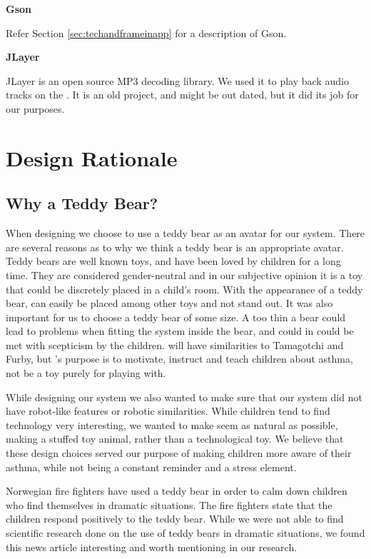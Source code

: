 \textbf{Gson}

Refer Section \ref{sec:techandframeinapp} for a description of Gson.    

\textbf{JLayer}

JLayer  is an open source MP3 decoding library. We used it to play back audio tracks on the \rpi{}. It is an old project, and might be out dated, but it did its job for our purposes.  
 

\section{Design Rationale}
\label{sec:designrationale}
\subsection{Why a Teddy Bear?}
When designing \buddy{} we choose to use a teddy bear as an avatar for our system. There are several reasons as to why we think a teddy bear is an appropriate avatar. Teddy bears are well known toys, and have been loved by children for a long time. They are considered gender-neutral\cite{stagnitti1997determining}\cite{cherney2006gender} and in our subjective opinion it is a toy that could be discretely placed in a child's room. With the appearance of a teddy bear, \buddy{} can easily be placed among other toys and not stand out. It was also important for us to choose a teddy bear of some size. A too thin a bear could lead to problems when fitting the system inside the bear, and could in could be met with scepticism by the children. \buddy{} will have similarities to Tamagotchi\cite{tamagotchi} and Furby\cite{furby}, but \buddy{}'s purpose is to motivate, instruct and teach children about asthma, not be a toy purely for playing with. 

While designing our system we also wanted to make sure that our system did not have robot-like features or robotic similarities. While children tend to find technology very interesting, we wanted to make \buddy{} seem as natural as possible, making a stuffed toy animal, rather than a technological toy. We believe that these design choices served our purpose of making children more aware of their asthma, while not being a constant reminder and a stress element. 

Norwegian fire fighters have used a teddy bear in order to calm down children who find themselves in dramatic situations. The fire fighters state that the children respond positively to the teddy bear. 
While we were not able to find scientific research done on the use of teddy bears in dramatic situations, we found this news article interesting and worth mentioning in our research. 

